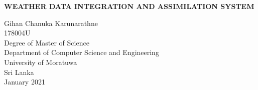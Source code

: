 \documentclass[a4paper,oneside,12pt]{report}
\begin{document}
\begin{titlepage}
    \begin{center}
        \Large{
        \textbf{WEATHER DATA INTEGRATION AND ASSIMILATION SYSTEM}}\\
        \vspace{144pt}
  \large      
       
        
        
        Gihan Chanuka Karunarathne\\
        \vspace{24pt}
      178004U\\
         \vspace{72pt}
        Degree of Master of Science\\
       
        
       \vspace{72pt}
        \large
        Department of Computer Science and Engineering\\
        \vspace{24pt}
        University of Moratuwa\\
        Sri Lanka\\
        \vspace{32pt}
        January 2021
        
    \end{center}
\end{titlepage}
\end{document}
